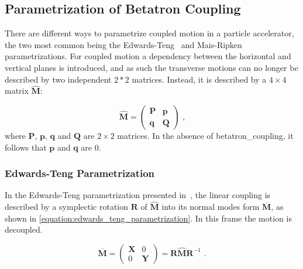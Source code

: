 \subsection{Parametrization of Betatron Coupling}
\label{subsection:parametrization_of_betatron_coupling}

There are different ways to parametrize coupled motion in a particle accelerator, the two most common being the Edwards-Teng~\cite{IEEE:Edwards:Parametrization_Linear_Coupled_Motion} and Mais-Ripken~\cite{AIP:Willeke:Methods_Beam_Optics} parametrizations.
For coupled motion a dependency between the horizontal and vertical planes is introduced, and as such the transverse motions can no longer be described by two independent \(2 * 2\) matrices.
Instead, it is described by a \(4 \times 4\) matrix \(\hat{\mathbf{M}}\):

\begin{equation}
    \hat{\mathbf{M}} = \left(
        \begin{array}{ll}
            \mathbf{P} & \mathbf{p} \\
            \mathbf{q} & \mathbf{Q}
    \end{array} \right) \text{ ,}
    \label{equation:coupled_motion_matrix}
\end{equation}
where \(\mathbf{P}\), \(\mathbf{p}\), \(\mathbf{q}\) and \(\mathbf{Q}\) are \(2 \times 2\) matrices.
In the absence of \gls{betatron_coupling}, it follows that \(\mathbf{p}\) and \(\mathbf{q}\) are \num{0}.

\subsubsection*{Edwards-Teng Parametrization}

In the Edwards-Teng parametrization presented in~\cite{IEEE:Edwards:Parametrization_Linear_Coupled_Motion}, the linear coupling is described by a symplectic rotation \(\mathbf{R}\) of \(\hat{\mathbf{M}}\) into its normal modes form \(\overline{\mathbf{M}}\), as shown in \cref{equation:edwards_teng_parametrization}.
In this frame the motion is decoupled.

\begin{equation}
    \overline{\mathbf{M}} = \left(
        \begin{array}{cc}
            \mathbf{X} & 0 \\
            0 & \mathbf{Y}
    \end{array} \right) = \mathbf{R} \hat{\mathbf{M}} \mathbf{R}^{-1} \text{ .}
    \label{equation:edwards_teng_parametrization}
\end{equation}

